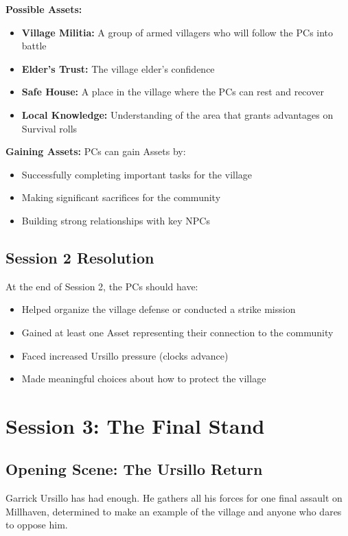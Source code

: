 \documentclass[11pt]{article}
\begin{document}
\textbf{Possible Assets:}
\begin{itemize}
\item \textbf{Village Militia:} A group of armed villagers who will follow the PCs into battle
\item \textbf{Elder's Trust:} The village elder's confidence
\item \textbf{Safe House:} A place in the village where the PCs can rest and recover
\item \textbf{Local Knowledge:} Understanding of the area that grants advantages on Survival rolls
\end{itemize}

\textbf{Gaining Assets:} PCs can gain Assets by:
\begin{itemize}
\item Successfully completing important tasks for the village
\item Making significant sacrifices for the community
\item Building strong relationships with key NPCs
\end{itemize}

\subsection{Session 2 Resolution}

At the end of Session 2, the PCs should have:
\begin{itemize}
\item Helped organize the village defense or conducted a strike mission
\item Gained at least one Asset representing their connection to the community
\item Faced increased Ursillo pressure (clocks advance)
\item Made meaningful choices about how to protect the village
\end{itemize}

\section{Session 3: The Final Stand}

\subsection{Opening Scene: The Ursillo Return}

Garrick Ursillo has had enough. He gathers all his forces for one final assault on Millhaven, determined to make an example of the village and anyone who dares to oppose him.
\end{document}
